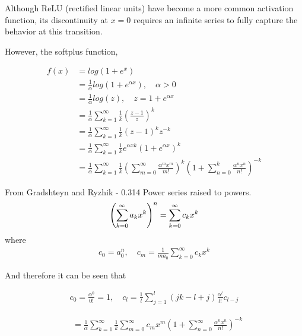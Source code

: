 Although ReLU (rectified linear units) have become a more common activation function, its discontinuity at $x = 0$ requires an infinite series to fully capture the behavior at this transition.

However, the softplus function,

\begin{align*}
	f(x) & = log(1+e^x)\\
	& = \frac{1}{\alpha}log(1+e^{\alpha x}), \quad \alpha > 0 \\
	& = \frac{1}{\alpha}log(z), \quad z = 1 + e^{\alpha x} \\
	& = \frac{1}{\alpha}\sum\limits_{k=1}^\infty
	\frac{1}{k}\left(\frac{z-1}{z}\right)^k \\
	& = \frac{1}{\alpha}\sum\limits_{k=1}^\infty
	\frac{1}{k}(z-1)^{k} z^{-k} \\
	& = \frac{1}{\alpha}\sum\limits_{k=1}^\infty
	\frac{1}{k} e^{\alpha x k} (1 + e^{\alpha x})^{k} \\
	& = \frac{1}{\alpha}\sum\limits_{k=1}^\infty
	\frac{1}{k} \left(\sum\limits_{m=0}^\infty
	\frac{\alpha^{m} x^{m}}{m!}\right)^k \left(1 + \sum\limits_{n=0}^{k} \frac{\alpha^{n} x^{n}}{n!}\right)^{-k}
\end{align*}

From Gradshteyn and Ryzhik - 0.314 Power series raised to powers.
\begin{equation}
	\left(\sum\limits_{k=0}^{\infty}a_{k}x^{k}\right)^{n} = \sum\limits_{k=0}^{\infty}c_{k}x^{k} \\
	\label{eqn:power series raised to powers}
\end{equation}
where
\begin{align*}
	c_{0} = a_{0}^{n}, \quad c_{m} = \frac{1}{ma_{0}}\sum\limits_{k=0}^{\infty}c_{k}x^{k}
\end{align*}

And therefore it can be seen that

\begin{align*}
	c_{0} = \frac{\alpha^{0}}{0!}=1, \quad c_{l} = \frac{1}{l}\sum\limits_{j=1}^{l}(jk-l+j)\frac{\alpha^{l}}{l!}c_{l-j}
\end{align*}

\begin{align*}
	& = \frac{1}{\alpha}\sum\limits_{k=1}^{\infty}\frac{1}{k}\sum\limits_{m=0}^{\infty}c_{m}x^{m}\left( 1+\sum\limits_{n=0}^{\infty}\frac{\alpha^{n}x^{n}}{n!}\right)^{-k} \\
\end{align*}

